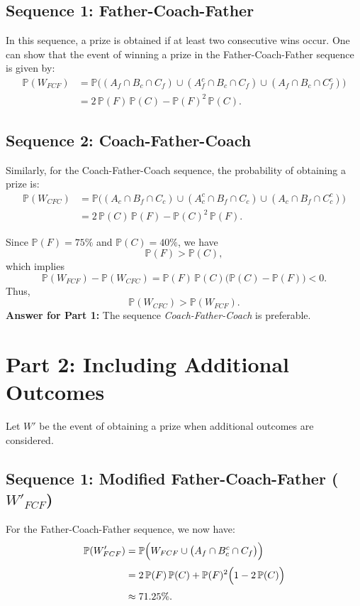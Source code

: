 \documentclass[12pt]{article}
\begin{document}
\subsection*{Sequence 1: Father-Coach-Father}
In this sequence, a prize is obtained if at least two consecutive wins occur. One can show that the event of winning a prize in the Father-Coach-Father sequence is given by:
\[
\begin{aligned}
\mathbb{P}(W_{FCF}) &= \mathbb{P}\Big((A_f \cap B_c \cap C_f) \cup (A_f^c \cap B_c \cap C_f) \cup (A_f \cap B_c \cap C_f^c)\Big)\\[1mm]
&= 2\,\mathbb{P}(F)\,\mathbb{P}(C) - \mathbb{P}(F)^2\,\mathbb{P}(C).
\end{aligned}
\]

\subsection*{Sequence 2: Coach-Father-Coach}
Similarly, for the Coach-Father-Coach sequence, the probability of obtaining a prize is:
\[
\begin{aligned}
\mathbb{P}(W_{CFC}) &= \mathbb{P}\Big((A_c \cap B_f \cap C_c) \cup (A_c^c \cap B_f \cap C_c) \cup (A_c \cap B_f \cap C_c^c)\Big)\\[1mm]
&= 2\,\mathbb{P}(C)\,\mathbb{P}(F) - \mathbb{P}(C)^2\,\mathbb{P}(F).
\end{aligned}
\]

Since $\mathbb{P}(F)=75\%$ and $\mathbb{P}(C)=40\%$, we have
\[
\mathbb{P}(F) > \mathbb{P}(C),
\]
which implies
\[
\mathbb{P}(W_{FCF}) - \mathbb{P}(W_{CFC}) = \mathbb{P}(F)\,\mathbb{P}(C)\bigl(\mathbb{P}(C) - \mathbb{P}(F)\bigr) < 0.
\]
Thus,
\[
\boxed{\mathbb{P}(W_{CFC}) > \mathbb{P}(W_{FCF})}.
\]
\textbf{Answer for Part 1:} The sequence \emph{Coach-Father-Coach} is preferable.

\bigskip

\section*{Part 2: Including Additional Outcomes}
Let $W'$ be the event of obtaining a prize when additional outcomes are considered.

\subsection*{Sequence 1: Modified Father-Coach-Father ($W'_{FCF}$)}
For the Father-Coach-Father sequence, we now have:
\[
\begin{aligned}
\mathbb{P}(W'_{FCF}) &= \mathbb{P}\Big(W_{FCF} \cup \bigl(A_f \cap B_c^c \cap C_f\bigr)\Big)\\[1mm]
&= 2\,\mathbb{P}(F)\,\mathbb{P}(C) + \mathbb{P}(F)^2\Bigl(1-2\,\mathbb{P}(C)\Bigr)\\[1mm]
&\approx 71.25\%.
\end{aligned}
\]
\end{document}
